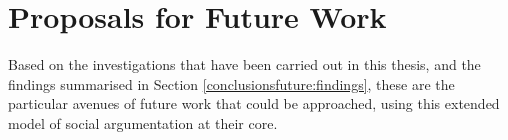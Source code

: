 



%
%
%


\section{Proposals for Future Work}

Based on the investigations that have been carried out in this thesis, and the findings summarised in Section \ref{conclusionsfuture:findings}, these are the particular avenues of future work that could be approached, using this extended model of social argumentation at their core.

